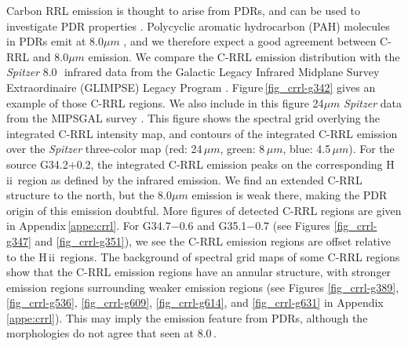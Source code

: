 \documentclass[manuscript]{aastex61}
\newcommand{\hii}{{\rm H\,}{{\sc ii}}}
\newcommand{\um}{\mu m}
\begin{document}
Carbon RRL emission is thought to arise from PDRs, and can be used to investigate PDR properties \citep[][etc.]{Pankonin1977,Natta1994,Roshi2007}.
Polycyclic aromatic hydrocarbon (PAH) molecules in PDRs emit at 8.0$\um$ \citep{Watson2008,Watson2009}, and we therefore expect a good agreement between C-RRL and 8.0$\um$ emission.
We compare the C-RRL emission distribution with the {\it Spitzer} 8.0\,\micron\ infrared data from the Galactic Legacy Infrared Midplane Survey Extraordinaire (GLIMPSE) Legacy Program \citep{Benjamin2003,Churchwell2009}.
Figure\,\ref{fig_crrl-g342} gives an example of those C-RRL regions.
We also include in this figure 24$\um$ {\it Spitzer} data from the MIPSGAL survey \citep{Carey2009, Gutermuth2015}.
This figure shows the spectral grid overlying the integrated C-RRL intensity map, and contours of the integrated C-RRL emission over the {\it Spitzer} three-color map (red: 24\,$\um$, green: 8\,$\um$, blue: 4.5\,$\um$).
For the source G34.2$+$0.2, the integrated C-RRL emission peaks on the corresponding \hii\ region as defined by the infrared emission.
We find an extended C-RRL structure to the north, but the 8.0$\um$ emission is weak there, making the PDR origin of this emission doubtful.
More figures of detected C-RRL regions are given in Appendix\,\ref{appe:crrl}.
For G34.7$-$0.6 and G35.1$-$0.7 (see Figures \ref{fig_crrl-g347} and \ref{fig_crrl-g351}), we see the C-RRL emission regions are offset relative to the \hii\ regions.
The background of spectral grid maps of some C-RRL regions show that the C-RRL emission regions have an annular structure, with stronger emission regions surrounding weaker emission regions (see Figures \ref{fig_crrl-g389}, \ref{fig_crrl-g536}, \ref{fig_crrl-g609}, \ref{fig_crrl-g614}, and \ref{fig_crrl-g631} in Appendix\,\ref{appe:crrl}).
This may imply the emission feature from PDRs, although the morphologies do not agree that seen at 8.0\,\micron.
\end{document}
